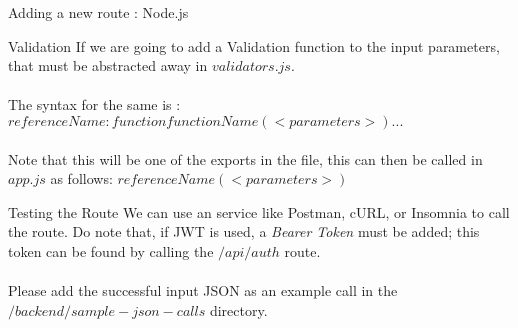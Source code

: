 \documentclass[
10pt, %
a4paper, %
oneside, %
headinclude,footinclude, %
BCOR5mm, %
]{scrartcl}
\begin{document}
\begin{section}{Adding a new route : Node.js}
\begin{subsection}{Validation}
If we are going to add a Validation function to the input parameters, that must be abstracted away in $validators.js$. \\ \\
The syntax for the same is : \\
$referenceName : function functionName(<parameters>) {...}$ \\ \\
Note that this will be one of the exports in the file, this can then be called in $app.js$ as follows: $referenceName(<parameters>)$

\begin{subsection}{Testing the Route}
We can use an service like Postman, cURL, or Insomnia to call the route. Do note that, if JWT is used, a \textit{Bearer Token} must be added; this token can be found by calling the $/api/auth$ route. \\ \\
Please add the successful input JSON as an example call in the $/backend/sample-json-calls$ directory. 

\end{subsection}

\end{subsection}
\newpage
\end{section}

\end{document}
